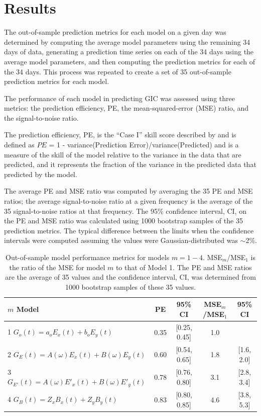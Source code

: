 \documentclass[draft,linenumbers]{agujournal2018}
\begin{document}
\section{Results}

The out-of-sample prediction metrics for each model on a given day was determined by computing the average model parameters using the remaining 34 days of data, generating a prediction time series on each of the 34 days using the average model parameters, and then computing the prediction metrics for each of the 34 days. This process was repeated to create a set of 35 out-of-sample prediction metrics for each model.

The performance of each model in predicting GIC was assessed using three metrics: the prediction efficiency, PE, the mean-squared-error (MSE) ratio, and the signal-to-noise ratio.

The prediction efficiency, PE, is the ``Case I'' skill score described by \cite{Murphy1988} and is defined as $PE$ = 1 - variance(Prediction Error)/variance(Predicted) and is a measure of the skill of the model relative to the variance in the data that are predicted, and it represents the fraction of the variance in the predicted data that predicted by the model.

The average PE and MSE ratio was computed by averaging the 35 PE and MSE ratios; the average signal-to-noise ratio at a given frequency is the average of the 35 signal-to-noise ratios at that frequency. The 95\% confidence interval, CI, on the PE and MSE ratio was calculated using 1000 bootstrap samples of the 35 prediction metrics. The typical difference between the limits when the confidence intervals were computed assuming the values were Gaussian-distributed was $\sim$2\%.

\begin{table}
\caption{Out-of-sample model performance metrics for models $m=1-4$. MSE$_m$/MSE$_1$ is the ratio of the MSE for model $m$ to that of Model 1. The PE and MSE ratios are the average of 35 values and the confidence interval, CI, was determined from 1000 bootstrap samples of these 35 values.}
\centering
\begin{tabular}{l c c c c}
\hline
$m$\hspace{1em} Model & PE & 95\% CI & MSE$_m$/MSE$_1$ & 95\% CI\\
\hline
1\hspace{1em} $G_o(t) = a_oE_x(t) + b_oE_y(t)$ & 0.35 & [0.25, 0.45] & 1.0 & \\
2\hspace{1em} $G_E(t) = A(\omega)E_x(t) + B(\omega)E_y(t)$ & 0.60 & [0.54, 0.65] & 1.8 & [1.6, 2.0]\\
3\hspace{1em} $G_{E'}(t) = A(\omega)E'_x(t) + B(\omega)E'_y(t)$ & 0.78 & [0.76, 0.80] & 3.1 & [2.8, 3.4]\\
4\hspace{1em} $G_{B}(t) = Z_xB_x(t) + Z_yB_y(t)$ & 0.83 & [0.80, 0.85] & 4.6 & [3.8, 5.3]\\
\hline
\end{tabular}
\end{table}
\end{document}
